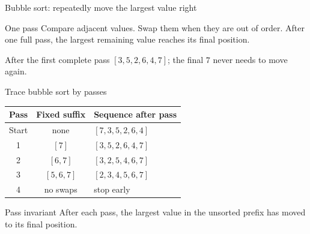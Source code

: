 \documentclass[aspectratio=169]{beamer}
\begin{document}
\begin{frame}{Bubble sort: repeatedly move the largest value right}
  \begin{block}{One pass}
    Compare adjacent values. Swap them when they are out of order. After one
    full pass, the largest remaining value reaches its final position.
  \end{block}
  \begin{center}
  \end{center}
  \begin{exampleblock}{After the first complete pass}
    $[3,5,2,6,4,7]$; the final $7$ never needs to move again.
  \end{exampleblock}
\end{frame}

\begin{frame}{Trace bubble sort by passes}
  \small
  \begin{center}
    \begin{tabular}{ccl}
      \toprule
      \textbf{Pass} & \textbf{Fixed suffix} & \textbf{Sequence after pass} \\
      \midrule
      Start & none & $[7,3,5,2,6,4]$ \\
      1 & $[7]$ & $[3,5,2,6,4,7]$ \\
      2 & $[6,7]$ & $[3,2,5,4,6,7]$ \\
      3 & $[5,6,7]$ & $[2,3,4,5,6,7]$ \\
      4 & no swaps & stop early \\
      \bottomrule
    \end{tabular}
  \end{center}
  \begin{alertblock}{Pass invariant}
    After each pass, the largest value in the unsorted prefix has moved to its
    final position.
  \end{alertblock}
\end{frame}
\end{document}
